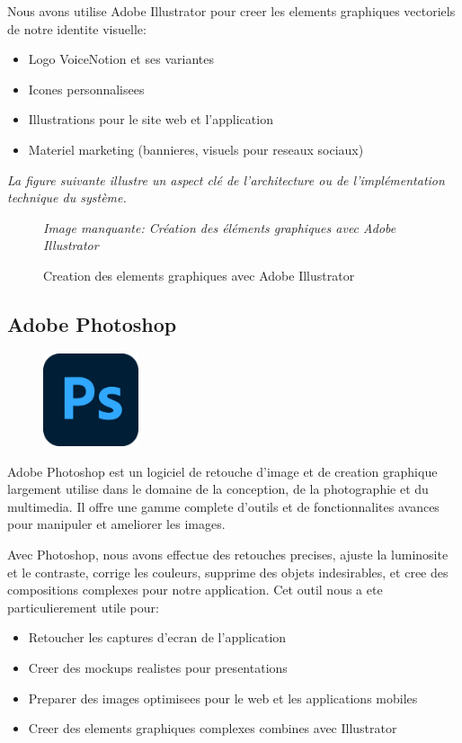 Nous avons utilise Adobe Illustrator pour creer les elements graphiques vectoriels de notre identite visuelle:

\begin{itemize}
    \item Logo VoiceNotion et ses variantes
    \item Icones personnalisees
    \item Illustrations pour le site web et l'application
    \item Materiel marketing (bannieres, visuels pour reseaux sociaux)
\end{itemize}

\noindent
\textit{La figure suivante illustre un aspect clé de l'architecture ou de l'implémentation technique du système.}
\begin{figure}[H]
\centering
\textit{Image manquante: Création des éléments graphiques avec Adobe Illustrator}
\caption{Creation des elements graphiques avec Adobe Illustrator}
\label{fig:illustrator-assets}
\end{figure}

\subsection{Adobe Photoshop}
\begin{figure}
    \centering
    \includegraphics[width=0.25\textwidth]{assets/docs/photoshop.png}
\end{figure}
Adobe Photoshop est un logiciel de retouche d'image et de creation graphique largement utilise dans le domaine de la conception, de la photographie et du multimedia. Il offre une gamme complete d'outils et de fonctionnalites avances pour manipuler et ameliorer les images.

Avec Photoshop, nous avons effectue des retouches precises, ajuste la luminosite et le contraste, corrige les couleurs, supprime des objets indesirables, et cree des compositions complexes pour notre application. Cet outil nous a ete particulierement utile pour:

\begin{itemize}
    \item Retoucher les captures d'ecran de l'application
    \item Creer des mockups realistes pour presentations
    \item Preparer des images optimisees pour le web et les applications mobiles
    \item Creer des elements graphiques complexes combines avec Illustrator
\end{itemize}

